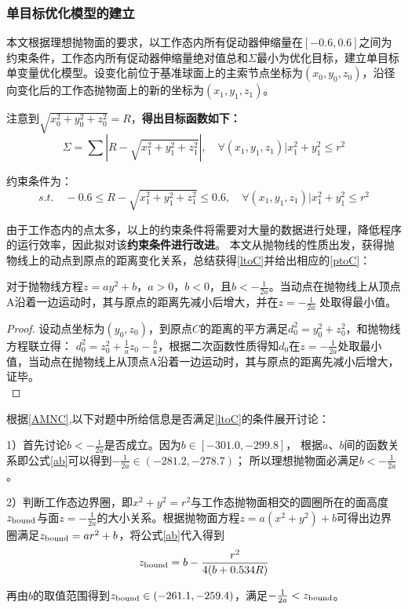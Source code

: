 \documentclass{cumcmthesis}
\begin{document}
\subsubsection{单目标优化模型的建立}
本文根据理想抛物面的要求，以工作态内所有促动器伸缩量在$[-0.6,0.6]$之间为约束条件，工作态内所有促动器伸缩量绝对值总和$\Sigma$最小为优化目标，建立单目标单变量优化模型。设变化前位于基准球面上的主索节点坐标为$(x_0,y_0,z_0)$，沿径向变化后的工作态抛物面上的新的坐标为$(x_1,y_1,z_1)$。\par 
注意到$\sqrt{x_0^2 + y_0^2 + z_0^2} = R$，\textbf{得出目标函数如下：}
\begin{equation}
	\Sigma = \sum |R - \sqrt{x_1^2 + y_1^2 + z_1^2}|,
	\quad \forall (x_1,y_1,z_1)|x_1^2 + y_1^2 \leq r^2
	\label{sumabs}
\end{equation}\par 
约束条件为：
\begin{equation}
	s.t.  \quad - 0.6 \leq R - \sqrt{x_1^2 + y_1^2 + z_1^2} \leq 0.6, \quad \forall (x_1,y_1,z_1)|x_1^2 + y_1^2 \leq r^2
	\label{st}
\end{equation}\par 
由于工作态内的点太多，以上的约束条件将需要对大量的数据进行处理，降低程序的运行效率，因此拟对该\textbf{约束条件进行改进}。
本文从抛物线的性质出发，获得抛物线上的动点到原点的距离变化关系，总结获得\cref{ltoC}并给出相应的\cref{ptoC}：\\

\begin{lemma}
	对于抛物线方程$z = ay^2 + b$，$a>0$，$b<0$，且$b < -\frac{1}{2a}$。当动点在抛物线上从顶点A沿着一边运动时，其与原点的距离先减小后增大，并在$z = -\frac{1}{2a}$ 处取得最小值。\\
	\label{ltoC}
\end{lemma}

\begin{proof}
	设动点坐标为$(y_0,z_0)$，到原点$C$的距离的平方满足$d_0^2 = y_0^2 + z_0^2$，和抛物线方程联立得：
	$d_0^2 = z_0^2 + \frac{1}{a}z_0 - \frac{b}{a}$，根据二次函数性质得知$d_0$在$z = -\frac{1}{2a}$处取最小值，当动点在抛物线上从顶点A沿着一边运动时，其与原点的距离先减小后增大，证毕。\\
	\label{ptoC}
\end{proof}\par 
根据\cref{AMNC},以下对题中所给信息是否满足\cref{ltoC}的条件展开讨论：\par 
	1）首先讨论$b < -\frac{1}{2a}$是否成立。因为$b \in [-301.0 ,-299.8]$，
	根据$a$、$b$间的函数关系即公式\cref{ab}可以得到$-\frac{1}{2a} \in (-281.2, -278.7)$；
	所以理想抛物面必满足$b < -\frac{1}{2a}$。\par
	2）判断工作态边界圈，即$x^2 + y^2 = r^2$与工作态抛物面相交的圆圈所在的面高度$z_{\rm{bound}}$与面$z = -\frac{1}{2a}$的大小关系。根据抛物面方程$z = a(x^2 + y^2)+b$可得出边界圈满足$z_{\rm{bound}} = ar^2 + b$，将公式\cref{ab}代入得到
	\begin{equation}
		z_{\rm{bound}} = b - \frac{r^2}{4(b + 0.534R)}
		\label{bound}
	\end{equation}\par 
	再由$b$的取值范围得到$z_{\rm{bound}} \in (-261.1, -259.4)$，满足$ -\frac{1}{2a} < z_{\rm{bound}}$。
\end{document}
